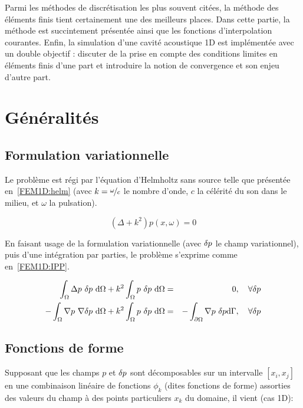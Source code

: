 Parmi les méthodes de discrétisation les plus souvent citées, la méthode des éléments finis tient certainement une
des meilleurs places. Dans cette partie, la méthode est succintement présentée ainsi que les fonctions d'interpolation
courantes. Enfin, la simulation d'une cavité acoustique 1D est implémentée avec un double objectif : discuter de la
prise en compte des conditions limites en éléments finis d'une part et introduire la notion de convergence et son
enjeu d'autre part.

\section{Généralités}
\label{FEM1D:subsection:linear}

\subsection{Formulation variationnelle}

Le problème est régi par l'équation d'Helmholtz sans source telle que présentée en~\eqref{FEM1D:helm} (avec $k =
\nicefrac{\omega}{c}$ le nombre d'onde, $c$ la célérité du son dans le milieu, et $\omega$ la pulsation).

\begin{equation}
	(\Delta + k^2)p(x,\omega) = 0 \label{FEM1D:helm}
\end{equation}

En faisant usage de la formulation variationnelle (avec $\delta p$ le champ variationnel), puis d'une intégration par
parties, le problème s'exprime comme en~\eqref{FEM1D:IPP}.

\begin{eqnarray}
	\int_\Omega \Delta p~\delta p~\mathrm{d}\Omega + k^2 \int_\Omega p~\delta p~\mathrm{d}\Omega & =  & 0,\quad \forall\delta p\notag\\
	- \int_\Omega \nabla p~\nabla \delta p ~\mathrm{d}\Omega + k^2\int_\Omega p~\delta p~\mathrm{d}\Omega & = & -\int_{\partial\Omega}\nabla p~\delta p\mathrm{d}\Gamma, \quad \forall\delta p \label{FEM1D:IPP}
\end{eqnarray}

\subsection{Fonctions de forme}

Supposant que les champs $p$ et $\delta p$ sont décomposables sur un intervalle $[x_i, x_j]$ en une combinaison linéaire de
fonctions $\phi_k$ (dites fonctions de forme) assorties des valeurs du champ à des points particuliers $x_k$ du domaine, il
vient (cas 1D):

